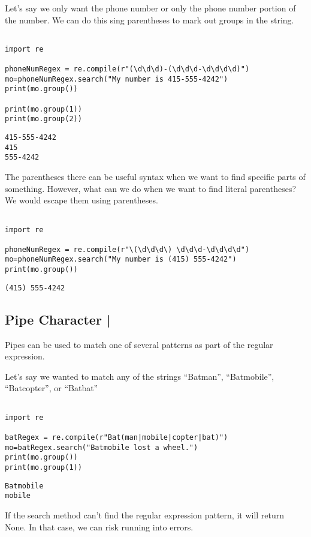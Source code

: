 \documentclass[11pt]{article}
\begin{document}
Let's say we only want the phone number or only the phone number portion of the number. We can do this sing parentheses to mark out groups in the string.

\begin{verbatim}

import re

phoneNumRegex = re.compile(r"(\d\d\d)-(\d\d\d-\d\d\d\d)")
mo=phoneNumRegex.search("My number is 415-555-4242")
print(mo.group())

print(mo.group(1))
print(mo.group(2))

\end{verbatim}

\begin{verbatim}
415-555-4242
415
555-4242
\end{verbatim}


The parentheses there can be useful syntax when we want to find specific parts of something. However, what can we do when we want to find literal parentheses? We would escape them using parentheses.

\begin{verbatim}

import re

phoneNumRegex = re.compile(r"\(\d\d\d\) \d\d\d-\d\d\d\d")
mo=phoneNumRegex.search("My number is (415) 555-4242")
print(mo.group())

\end{verbatim}

\begin{verbatim}
(415) 555-4242
\end{verbatim}

\subsection{Pipe Character |}
\label{sec:org7ca0222}

Pipes can be used to match one of several patterns as part of the regular expression.

Let's say we wanted to match any of the strings ``Batman'', ``Batmobile'', ``Batcopter'', or ``Batbat''


\begin{verbatim}

import re

batRegex = re.compile(r"Bat(man|mobile|copter|bat)")
mo=batRegex.search("Batmobile lost a wheel.")
print(mo.group())
print(mo.group(1))

\end{verbatim}

\begin{verbatim}
Batmobile
mobile
\end{verbatim}


If the search method can't find the regular expression pattern, it will return None. In that case, we can risk running into errors.
\end{document}
